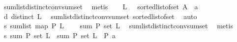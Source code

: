 \begin{isabellebody}
\ sum{\isacharunderscore}{\kern0pt}list{\isacharunderscore}{\kern0pt}distinct{\isacharunderscore}{\kern0pt}conv{\isacharunderscore}{\kern0pt}sum{\isacharunderscore}{\kern0pt}set\ \isamarkupfalse%
\ metis\isanewline
\ \ \isamarkupfalse%
\ {\isacharquery}{\kern0pt}L{}\ {\isacharequal}{\kern0pt}\ {\isachardoublequoteopen}\ {\isacharparenleft}{\kern0pt}sorted{\isacharunderscore}{\kern0pt}list{\isacharunderscore}{\kern0pt}of{\isacharunderscore}{\kern0pt}set\ {\isacharparenleft}{\kern0pt}A\ {\isacharminus}{\kern0pt}\ {\isacharbraceleft}{\kern0pt}a{\isacharbraceright}{\kern0pt}{\isacharparenright}{\kern0pt}{\isacharparenright}{\kern0pt}{\isachardoublequoteclose}\isanewline
\ \ \isamarkupfalse%
\ d{\isacharunderscore}{\kern0pt}{}{\isacharcolon}{\kern0pt}\ {\isachardoublequoteopen}distinct\ {\isacharquery}{\kern0pt}L{}{\isachardoublequoteclose}\ \isamarkupfalse%
\ sum{\isacharunderscore}{\kern0pt}list{\isacharunderscore}{\kern0pt}distinct{\isacharunderscore}{\kern0pt}conv{\isacharunderscore}{\kern0pt}sum{\isacharunderscore}{\kern0pt}set\ sorted{\isacharunderscore}{\kern0pt}list{\isacharunderscore}{\kern0pt}of{\isacharunderscore}{\kern0pt}set{\isacharparenleft}{\kern0pt}{}{\isacharparenright}{\kern0pt}\ \isamarkupfalse%
\ auto\isanewline
\ \ \isamarkupfalse%
\ \isamarkupfalse%
\ s{\isacharunderscore}{\kern0pt}{}{\isacharcolon}{\kern0pt}\ {\isachardoublequoteopen}sum{\isacharunderscore}{\kern0pt}list\ {\isacharparenleft}{\kern0pt}{\isacharparenleft}{\kern0pt}map\ P{\isacharparenright}{\kern0pt}\ {\isacharquery}{\kern0pt}L{}{\isacharparenright}{\kern0pt}\ \isanewline
\ \ {\isacharequal}{\kern0pt}\ sum\ P\ {\isacharparenleft}{\kern0pt}set\ {\isacharquery}{\kern0pt}L{}{\isacharparenright}{\kern0pt}{\isachardoublequoteclose}\ \isamarkupfalse%
\ sum{\isacharunderscore}{\kern0pt}list{\isacharunderscore}{\kern0pt}distinct{\isacharunderscore}{\kern0pt}conv{\isacharunderscore}{\kern0pt}sum{\isacharunderscore}{\kern0pt}set\ \isamarkupfalse%
\ metis\isanewline
\ \ \isamarkupfalse%
\ s{\isacharunderscore}{\kern0pt}{}{\isacharcolon}{\kern0pt}\ {\isachardoublequoteopen}sum\ P\ {\isacharparenleft}{\kern0pt}set\ {\isacharquery}{\kern0pt}L{}{\isacharparenright}{\kern0pt}\ {\isacharequal}{\kern0pt}\ sum\ P\ {\isacharparenleft}{\kern0pt}set\ {\isacharquery}{\kern0pt}L{}{\isacharparenright}{\kern0pt}\ {\isacharminus}{\kern0pt}\ {\isacharparenleft}{\kern0pt}P\ a{\isacharparenright}{\kern0pt}{\isachardoublequoteclose}\isanewline

\end{isabellebody}
